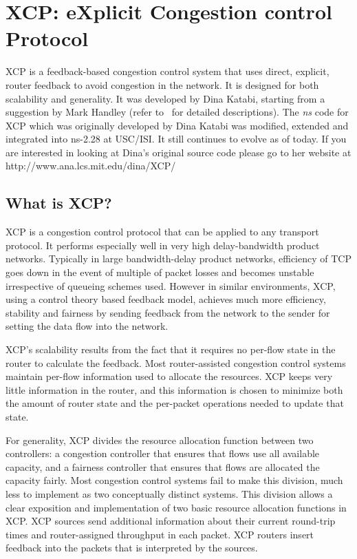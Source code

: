 \chapter{XCP: eXplicit Congestion control Protocol}
\label{chap:xcp}

XCP is a feedback-based congestion control system that uses direct,
explicit, router feedback to avoid congestion in the network.  It is
designed for both scalability and generality.  It was developed by
Dina Katabi, starting from a suggestion by Mark Handley (refer
to~\cite{Katabi02} for detailed descriptions). 
The \emph{ns}{} code for XCP which was originally developed by Dina Katabi was
modified, extended and integrated into ns-2.28 at USC/ISI. It still
continues to evolve as of today. If you are interested in looking at
Dina's original source code please go to her website at
http://www.ana.lcs.mit.edu/dina/XCP/ 

\section{What is XCP?}
\label{sec:xcp?}
XCP is a congestion control protocol that can be applied to any
transport protocol. It performs especially well in very high
delay-bandwidth product networks. Typically in large bandwidth-delay
product networks, efficiency of TCP goes down in the event of multiple of
packet losses and becomes unstable irrespective of queueing schemes
used. However in similar environments, XCP, using a control theory
based feedback
model, achieves much more efficiency, stability and fairness by
sending feedback from the network to the sender for setting the data
flow into the network.

XCP's scalability results from the fact that it requires no per-flow
state in the router to calculate the feedback.  Most router-assisted
congestion control systems maintain per-flow information used to
allocate the resources.  XCP keeps very little information in the
router, and this information is chosen to minimize both the amount of
router state and the per-packet operations needed to update that state.

For generality, XCP divides the resource allocation function between
two controllers: a congestion controller that ensures that flows use
all available capacity, and a fairness controller that ensures that
flows are allocated the capacity fairly.  Most congestion control
systems fail to make this division, much less to implement as two
conceptually distinct systems.  This division allows a clear
exposition and implementation of two basic resource allocation
functions in XCP. XCP sources send additional information about their
current round-trip times and router-assigned throughput in each
packet. XCP routers insert feedback into the packets that is
interpreted by the sources. 
  
